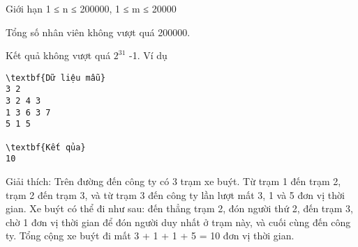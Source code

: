 Giới hạn
1 ≤ n ≤ 200000, 1 ≤ m ≤ 20000  

   Tổng số nhân viên không vượt quá 200000.  

   Kết quả không vượt quá $2^{31}$   -1.
Ví dụ
\begin{verbatim}
\textbf{Dữ liệu mẫu}
3 2
3 2 4 3
1 3 6 3 7
5 1 5

\textbf{Kết qủa}
10
\end{verbatim}

   Giải thích: Trên đường đến công ty có 3 trạm xe buýt. Từ trạm 1 đến trạm 2, trạm 2 đến trạm 3, và từ trạm 3 đến công ty lần lượt mất 3, 1 và 5 đơn vị thời gian. Xe buýt có thể đi như sau: đến thẳng trạm 2, đón người thứ 2, đến trạm 3, chờ 1 đơn vị thời gian để đón người duy nhất ở trạm này, và cuối cùng đến công ty. Tổng cộng xe buýt đi mất 3 + 1 + 1 + 5 = 10 đơn vị thời gian.